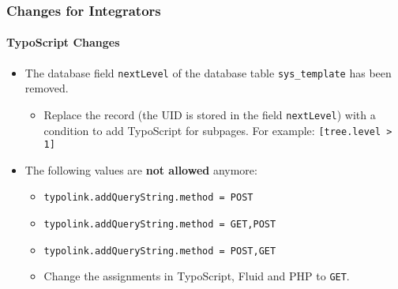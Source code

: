 
\begin{frame}[fragile]
	\frametitle{Changes for Integrators}
	\framesubtitle{TypoScript Changes}

	\begin{itemize}
		\item The database field \texttt{nextLevel} of the database table
			\texttt{sys\_template} has been removed.

			\begin{itemize}\smaller
				\item[\ding{228}] Replace the record (the UID is stored in the field \texttt{nextLevel}) with a condition to add TypoScript for subpages. For example: \texttt{[tree.level > 1]}
			\end{itemize}\normalsize

		\item The following values are \textbf{not allowed} anymore:

			\begin{itemize}\smaller
				\item \texttt{typolink.addQueryString.method = POST}
				\item \texttt{typolink.addQueryString.method = GET,POST}
				\item \texttt{typolink.addQueryString.method = POST,GET}
			\end{itemize}\normalsize

			\begin{itemize}\smaller
				\item[\ding{228}] Change the assignments in TypoScript, Fluid and PHP to \texttt{GET}.
			\end{itemize}\normalsize

	\end{itemize}

\end{frame}


